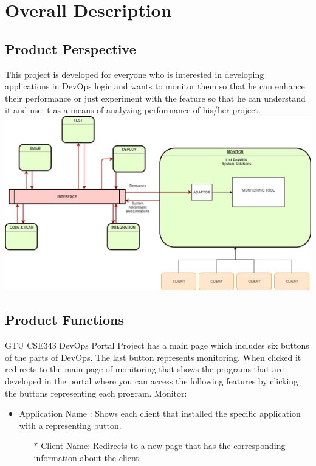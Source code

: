\documentclass{article}
\begin{document}
\section{Overall Description} 
	\subsection{ Product Perspective}
    This project  is developed for everyone who is interested in developing applications in DevOps logic and wants to monitor them so that he can enhance their performance or just experiment with the feature so that he can understand it and use it as a means of analyzing performance of his/her project.
\newline \newline
\includegraphics[width=15cm]{uml} %
\newline
	\subsection{Product Functions}
GTU CSE343 DevOps Portal Project has a main page which includes six buttons of the parts of DevOps. The last button represents  monitoring. When clicked it redirects to the main page of monitoring that shows the programs that are developed in the portal where you can access the following features by clicking the buttons representing each program. \newline \newline
\newline \newline Monitor: 
 \begin{itemize}
  	\item Application Name : Shows each client that installed the specific application with a representing button.
	 \begin{itemize}
      		\item[$\ast$]{Client Name: Redirects to a new page that has the corresponding information about the client.}	
    \end{itemize}
\end{itemize}
\end{document}
